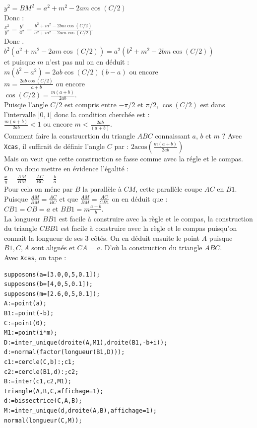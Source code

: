 \documentclass[a4paper,11pt]{book}
\newcommand{\acos}{\mbox{acos}}
\begin{document}
$y^2=BM^2=a^2+m^2-2am\cos(C/2)$\\
Donc :\\
$\displaystyle \frac{x^2}{y^2}=\frac{b^2}{a^2}=\frac{b^2+m^2-2bm\cos(C/2)}{a^2+m^2-2am\cos(C/2)}$\\
Donc .\\
$b^2(a^2+m^2-2am\cos(C/2))=a^2(b^2+m^2-2bm\cos(C/2))$\\
et puisque $m$ n'est pas nul on en d\'eduit :\\
$m(b^2-a^2)=2ab\cos(C/2)(b-a)$ ou encore \\
$\displaystyle m=\frac{2ab\cos(C/2)}{a+b}$ ou encore \\
$\displaystyle \cos(C/2)=\frac{m(a+b)}{2ab}$.\\
Puisqie l'angle $C/2$ est compris entre $-\pi/2$ et $\pi/2$, $\cos(C/2)$ est dans l'intervalle $]0,1[$ donc la condition cherch\'ee est :\\
$\displaystyle  \frac{m(a+b)}{2ab}<1$ ou encore $\displaystyle m<\frac{2ab}{(a+b)}$.\\
Comment faire la construcrtion du triangle $ABC$ connaissant $a$, $b$ et $m$ ?
Avec {\tt Xcas}, il suffirait de d\'efinir l'angle $C$ par :
$\displaystyle 2\acos(\frac{m(a+b)}{2ab})$\\
Mais on veut que cette construction se fasse comme avec la r\'egle et le compas.
On va donc mettre en \'evidence l'\'egalit\'e :\\
$\displaystyle \frac{x}{y}=\frac{AM}{BM}=\frac{AC}{BC}=\frac{b}{a}$\\
Pour cela on m\'ene par $B$ la parall\`ele \`a $CM$, cette parall\`ele coupe 
$AC$ en $B1$. \\
Puisque $\displaystyle \frac{AM}{BM}=\frac{AC}{BC}$ et que 
$\displaystyle \frac{AM}{BM}=\frac{AC}{CB1}$ on en d\'eduit que :\\
$CB1=CB=a$ et $\displaystyle BB1=m\frac{a+b}{b}$.\\
La longueur $BB1$ est facile \`a construire avec la r\`egle et le compas, la 
construction du triangle  $CBB1$ est facile \`a construire avec la r\`egle et 
le compas puisqu'on connait la longueur de ses 3 c\^ot\'es.
On en d\'eduit ensuite le point $A$ puisque $B1,C,A$ sont align\'es et $CA=a$.
D'o\`u la construction du triangle $ABC$.\\
Avec {\tt Xcas}, on tape :
\begin{verbatim}
supposons(a=[3.0,0,5,0.1]);
supposons(b=[4,0,5,0.1]);
supposons(m=[2.6,0,5,0.1]);
A:=point(a);
B1:=point(-b);
C:=point(0);
M1:=point(i*m);
D:=inter_unique(droite(A,M1),droite(B1,-b+i));
d:=normal(factor(longueur(B1,D)));
c1:=cercle(C,b):;c1;
c2:=cercle(B1,d):;c2;
B:=inter(c1,c2,M1);
triangle(A,B,C,affichage=1);
d:=bissectrice(C,A,B);
M:=inter_unique(d,droite(A,B),affichage=1);
normal(longueur(C,M));
\end{verbatim}
\end{document}
